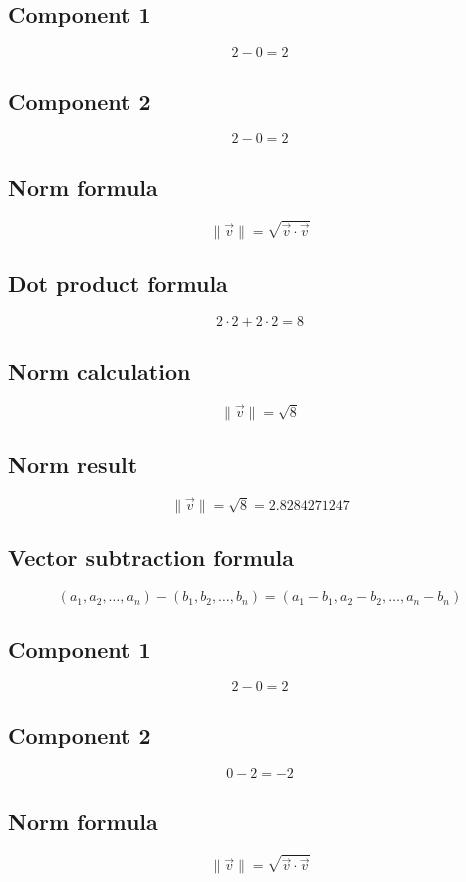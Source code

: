 \documentclass{article}
\begin{document}
\subsection*{ \vspace{1em} Component 1}
\[
2 - 0 = 2
\]
\subsection*{ \vspace{1em} Component 2}
\[
2 - 0 = 2
\]
\subsection*{ \vspace{1em} Norm formula}
\[
\|\vec{v}\| = \sqrt{\vec{v} \cdot \vec{v}}
\]
\subsection*{ \vspace{1em} Dot product formula}
\[
2 \cdot 2 + 2 \cdot 2 = 8
\]
\subsection*{ \vspace{1em} Norm calculation}
\[
\|\vec{v}\| = \sqrt{8}
\]
\subsection*{ \vspace{1em} Norm result}
\[
\|\vec{v}\| = \sqrt{8} = 2.8284271247
\]
\subsection*{ \vspace{1em} Vector subtraction formula}
\[
(a_1, a_2, \dots, a_n) - (b_1, b_2, \dots, b_n) = (a_1 - b_1, a_2 - b_2, \dots, a_n - b_n)
\]
\subsection*{ \vspace{1em} Component 1}
\[
2 - 0 = 2
\]
\subsection*{ \vspace{1em} Component 2}
\[
0 - 2 = -2
\]
\subsection*{ \vspace{1em} Norm formula}
\[
\|\vec{v}\| = \sqrt{\vec{v} \cdot \vec{v}}
\]
\end{document}
